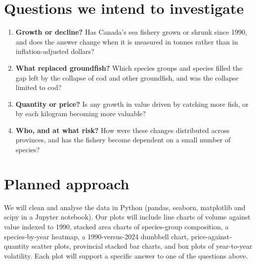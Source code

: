 \documentclass[12pt,letterpaper]{article}
\begin{document}
\section{Questions we intend to investigate}
\begin{enumerate}[label=\textbf{Q\arabic*.}, leftmargin=2.3em]
  \item \textbf{Growth or decline?} Has Canada's sea fishery grown or shrunk since 1990, and does
        the answer change when it is measured in tonnes rather than in inflation-adjusted dollars?
  \item \textbf{What replaced groundfish?} Which species groups and species filled the gap left
        by the collapse of cod and other groundfish, and was the collapse limited to cod?
  \item \textbf{Quantity or price?} Is any growth in value driven by catching more fish, or by
        each kilogram becoming more valuable?
  \item \textbf{Who, and at what risk?} How were these changes distributed across provinces,
        and has the fishery become dependent on a small number of species?
\end{enumerate}

\section{Planned approach}
We will clean and analyse the data in Python (pandas, seaborn, matplotlib and scipy in a Jupyter
notebook). Our plots will include line charts of volume against value indexed to 1990, stacked
area charts of species-group composition, a species-by-year heatmap, a 1990-versus-2024 dumbbell
chart, price-against-quantity scatter plots, provincial stacked bar charts, and box plots of
year-to-year volatility. Each plot will support a specific answer to one of the questions above.
\end{document}
